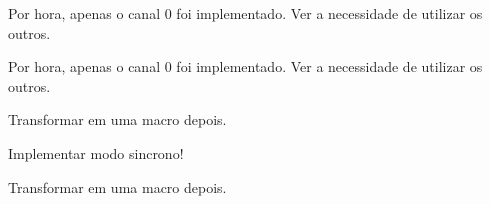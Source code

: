 
\begin{DoxyRefList}
\item[\label{todo__todo000001}%
\hypertarget{todo__todo000001}{}%
Member \hyperlink{analog_8h_aaac550cf000789bda83df7d9e151e8a4}{analog\+\_\+channel\+\_\+select\+\_\+t} ]Por hora, apenas o canal 0 foi implementado. Ver a necessidade de utilizar os outros.  
\item[\label{todo__todo000001}%
\hypertarget{todo__todo000001}{}%
Member \hyperlink{analog_8h_aaac550cf000789bda83df7d9e151e8a4}{analog\+\_\+channel\+\_\+select\+\_\+t} ]Por hora, apenas o canal 0 foi implementado. Ver a necessidade de utilizar os outros.  
\item[\label{todo__todo000004}%
\hypertarget{todo__todo000004}{}%
Member \hyperlink{usart_8h_a8016e6fb6f0a421fb1622403ccf7b16a}{usart\+\_\+receive\+\_\+interrupt\+\_\+isr} ()]Transformar em uma macro depois.  
\item[\label{todo__todo000002}%
\hypertarget{todo__todo000002}{}%
Member \hyperlink{usart_8h_a8a68523fcfebe109df61258219ae9688}{usart\+\_\+start} (usart\+\_\+sync\+\_\+mode\+\_\+t usart\+\_\+sync\+\_\+mode, uint32\+\_\+t baud\+\_\+rate)]Implementar modo sincrono!  
\item[\label{todo__todo000003}%
\hypertarget{todo__todo000003}{}%
Member \hyperlink{usart_8h_a0f565c4ece40219cd8e0499edb19f600}{usart\+\_\+transmite\+\_\+interrupt\+\_\+isr} ()]Transformar em uma macro depois. 
\end{DoxyRefList}
